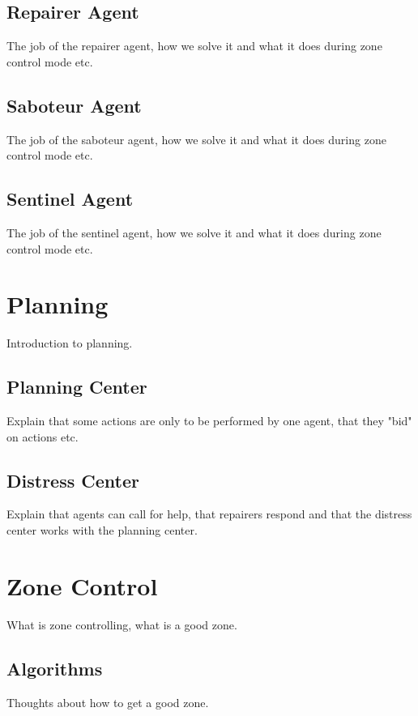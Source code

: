 \documentclass[11pt]{article}
\begin{document}
\subsection{Repairer Agent}
The job of the repairer agent, how we solve it and what it does during zone control mode etc.

\subsection{Saboteur Agent}
The job of the saboteur agent, how we solve it and what it does during zone control mode etc.

\subsection{Sentinel Agent}
The job of the sentinel agent, how we solve it and what it does during zone control mode etc.

\section{Planning}
Introduction to planning.

\subsection{Planning Center}
Explain that some actions are only to be performed by one agent, that they "bid" on actions etc.

\subsection{Distress Center}
Explain that agents can call for help, that repairers respond and that the distress center works with the planning center.

\section{Zone Control}
What is zone controlling, what is a good zone.

\subsection{Algorithms}
Thoughts about how to get a good zone.
\end{document}
